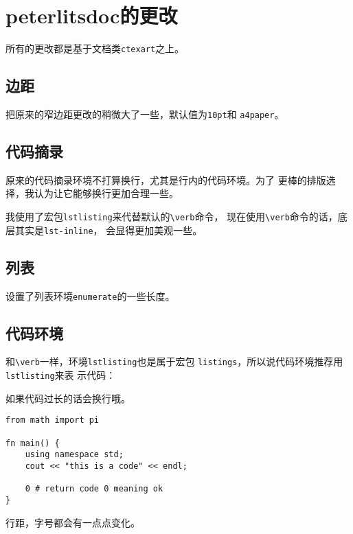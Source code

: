 \documentclass{peterlitsdoc}
\newcommand{\vb}{\verb}
\begin{document}

\section{peterlitsdoc的更改}

所有的更改都是基于文档类\vb|ctexart|之上。


\subsection{边距}

把原来的窄边距更改的稍微大了一些，默认值为\vb|10pt|和
\vb|a4paper|。


\subsection{代码摘录}

原来的代码摘录环境不打算换行，尤其是行内的代码环境。为了
更棒的排版选择，我认为让它能够换行更加合理一些。

我使用了宏包\vb|lstlisting|来代替默认的\verb|\verb|命令，
现在使用\verb|\verb|命令的话，底层其实是\vb|lst-inline|，
会显得更加美观一些。


\subsection{列表}

设置了列表环境\vb|enumerate|的一些长度。


\subsection{代码环境}

和\verb|\verb|一样，环境\vb|lstlisting|也是属于宏包
\vb|listings|，所以说代码环境推荐用\vb|lstlisting|来表
示代码：

\begin{pltrun}
如果代码过长的话会换行哦。
\begin{lstlisting}
from math import pi

fn main() {
    using namespace std;
    cout << "this is a code" << endl;

    0 # return code 0 meaning ok
}
\end{lstlisting}

行距，字号都会有一点点变化。
\end{pltrun}
\end{document}
